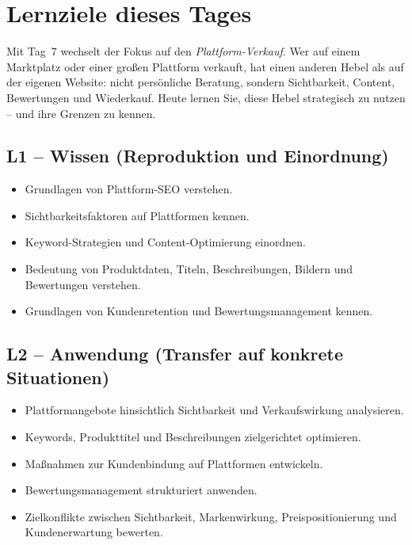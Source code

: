 \documentclass[11pt,a4paper,oneside]{article}
\begin{document}
\section*{Lernziele dieses Tages}
\thispagestyle{plain}

\noindent Mit Tag~7 wechselt der Fokus auf den \emph{Plattform-Verkauf}. Wer auf einem Marktplatz oder einer großen Plattform verkauft, hat einen anderen Hebel als auf der eigenen Website: nicht persönliche Beratung, sondern Sichtbarkeit, Content, Bewertungen und Wiederkauf. Heute lernen Sie, diese Hebel strategisch zu nutzen -- und ihre Grenzen zu kennen.

\subsection*{L1 -- Wissen (Reproduktion und Einordnung)}
\begin{itemize}
  \item Grundlagen von Plattform-SEO verstehen.
  \item Sichtbarkeitsfaktoren auf Plattformen kennen.
  \item Keyword-Strategien und Content-Optimierung einordnen.
  \item Bedeutung von Produktdaten, Titeln, Beschreibungen, Bildern und Bewertungen verstehen.
  \item Grundlagen von Kundenretention und Bewertungsmanagement kennen.
\end{itemize}

\subsection*{L2 -- Anwendung (Transfer auf konkrete Situationen)}
\begin{itemize}
  \item Plattformangebote hinsichtlich Sichtbarkeit und Verkaufswirkung analysieren.
  \item Keywords, Produkttitel und Beschreibungen zielgerichtet optimieren.
  \item Maßnahmen zur Kundenbindung auf Plattformen entwickeln.
  \item Bewertungsmanagement strukturiert anwenden.
  \item Zielkonflikte zwischen Sichtbarkeit, Markenwirkung, Preispositionierung und Kundenerwartung bewerten.
\end{itemize}
\end{document}
